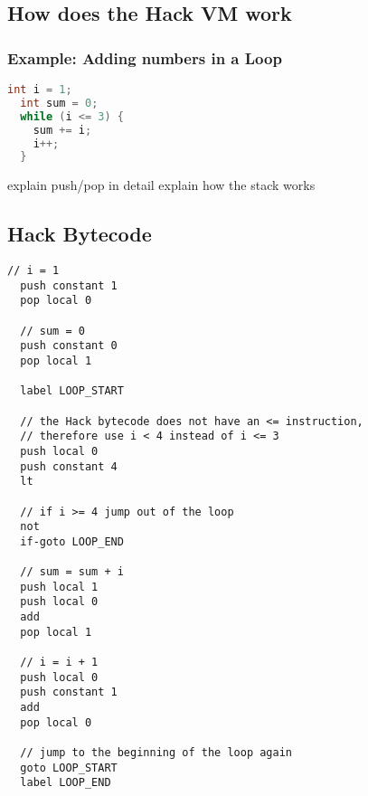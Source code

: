 
\subsection{How does the Hack VM work}
\subsubsection{Example: Adding numbers in a Loop}
\begin{lstlisting}[language=C, caption={Calculate 1 + 2 + 3 in C}, captionpos=b]
  int i = 1;
  int sum = 0;
  while (i <= 3) {
    sum += i;
    i++;
  }
\end{lstlisting}

explain push/pop in detail
explain how the stack works

\subsection{Hack Bytecode}
\begin{lstlisting}[caption={Calculate 1 + 2 + 3 in the Hack VM}, captionpos=b]
  // i = 1
  push constant 1
  pop local 0

  // sum = 0
  push constant 0
  pop local 1

  label LOOP_START

  // the Hack bytecode does not have an <= instruction,
  // therefore use i < 4 instead of i <= 3
  push local 0
  push constant 4
  lt

  // if i >= 4 jump out of the loop
  not
  if-goto LOOP_END

  // sum = sum + i
  push local 1
  push local 0
  add
  pop local 1

  // i = i + 1
  push local 0
  push constant 1
  add
  pop local 0

  // jump to the beginning of the loop again
  goto LOOP_START
  label LOOP_END
\end{lstlisting}
